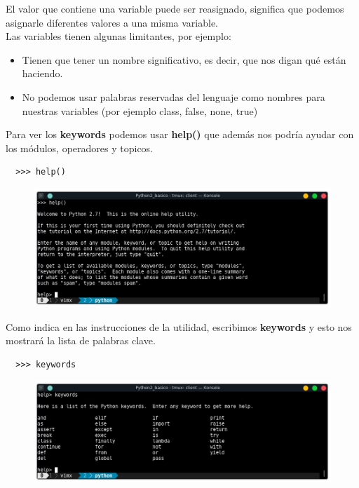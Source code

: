 \documentclass{article}
\begin{document}
El valor que contiene una variable puede ser reasignado, significa que podemos
asignarle diferentes valores a una misma variable.\\

Las variables tienen algunas limitantes, por ejemplo:

\begin{itemize}
  \item Tienen que tener un nombre significativo, es decir, que nos digan qué
    están haciendo.
  \item No podemos usar palabras reservadas del lenguaje como nombres para
    nuestras variables (por ejemplo class, false, none, true)
\end{itemize}

Para ver los \textbf{keywords} podemos usar \textbf{help()} que además nos
podría ayudar con los módulos, operadores y topicos.

\begin{verbatim}
  >>> help()
\end{verbatim}

\begin{figure}[h!]
  \centering
  \includegraphics[scale=0.75]{./Pictures/014_help_python.png}
\end{figure}

Como indica en las instrucciones de la utilidad, escribimos \textbf{keywords} y
esto nos mostrará la lista de palabras clave.

\begin{verbatim}
  >>> keywords
\end{verbatim}

\begin{figure}[h!]
  \centering
  \includegraphics[scale=0.75]{./Pictures/015_keywords.png}
\end{figure}
\end{document}
